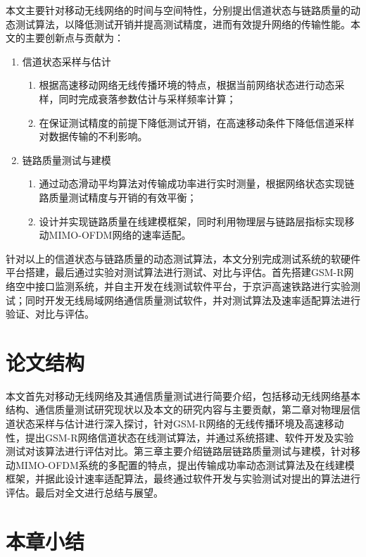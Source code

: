 本文主要针对移动无线网络的时间与空间特性，分别提出信道状态与链路质量的动态测试算法，以降低测试开销并提高测试精度，进而有效提升网络的传输性能。本文的主要创新点与贡献为：
\begin{enumerate}
\item 信道状态采样与估计
    \begin{enumerate}
      \item 根据高速移动网络无线传播环境的特点，根据当前网络状态进行动态采样，同时完成衰落参数估计与采样频率计算；
      \item 在保证测试精度的前提下降低测试开销，在高速移动条件下降低信道采样对数据传输的不利影响。
    \end{enumerate}
\item 链路质量测试与建模
    \begin{enumerate}
      \item 通过动态滑动平均算法对传输成功率进行实时测量，根据网络状态实现链路质量测试精度与开销的有效平衡；
      \item 设计并实现链路质量在线建模框架，同时利用物理层与链路层指标实现移动MIMO-OFDM网络的速率适配。
    \end{enumerate}
\end{enumerate}
针对以上的信道状态与链路质量的动态测试算法，本文分别完成测试系统的软硬件平台搭建，最后通过实验对测试算法进行测试、对比与评估。首先搭建GSM-R网络空中接口监测系统，并自主开发在线测试软件平台，于京沪高速铁路进行实验测试；同时开发无线局域网络通信质量测试软件，并对测试算法及速率适配算法进行验证、对比与评估。

\section{论文结构}

本文首先对移动无线网络及其通信质量测试进行简要介绍，包括移动无线网络基本结构、通信质量测试研究现状以及本文的研究内容与主要贡献，第二章对物理层信道状态采样与估计进行深入探讨，针对GSM-R网络的无线传播环境及高速移动性，提出GSM-R网络信道状态在线测试算法，并通过系统搭建、软件开发及实验测试对该算法进行评估对比。第三章主要介绍链路层链路质量测试与建模，针对移动MIMO-OFDM系统的多配置的特点，提出传输成功率动态测试算法及在线建模框架，并据此设计速率适配算法，最终通过软件开发与实验测试对提出的算法进行评估。最后对全文进行总结与展望。

\section{本章小结}

